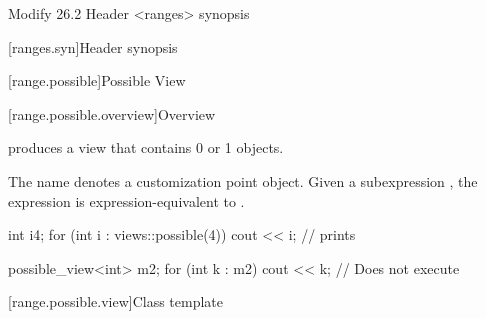 
Modify 26.2 Header <ranges> synopsis

[ranges.syn]{Header  synopsis}


[range.possible]{Possible View}

[range.possible.overview]{Overview}

\pnum
{} produces a view that contains 0 or 1 objects.


\pnum
{}%
The name  denotes a
customization point object.
Given a subexpression , the expression
 is expression-equivalent to
.


\begin{example}
  \begin{codeblock}
int i{4};
for (int i : views::possible(4))
  cout << i;        // prints 

possible_view<int> m2{};
for (int k : m2)
  cout << k;        // Does not execute
\end{codeblock}
\end{example}

[range.possible.view]{Class template }

